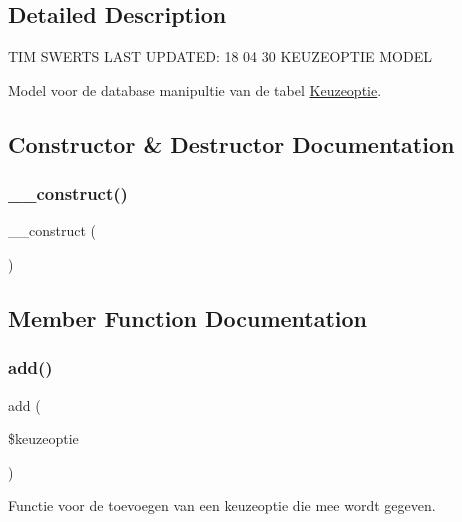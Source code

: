 \subsection{Detailed Description}
T\+IM S\+W\+E\+R\+TS L\+A\+ST U\+P\+D\+A\+T\+ED\+: 18 04 30 K\+E\+U\+Z\+E\+O\+P\+T\+IE M\+O\+D\+EL

Model voor de database manipultie van de tabel \mbox{\hyperlink{class_keuzeoptie}{Keuzeoptie}}. 

\subsection{Constructor \& Destructor Documentation}
\mbox{\label{class_keuzeoptie___model_a095c5d389db211932136b53f25f39685}} 
\subsubsection{\texorpdfstring{\+\_\+\+\_\+construct()}{\_\_construct()}}
{\footnotesize\ttfamily \+\_\+\+\_\+construct (\begin{DoxyParamCaption}{ }\end{DoxyParamCaption})}



\subsection{Member Function Documentation}
\mbox{\label{class_keuzeoptie___model_a2452f524e794bc3f418d60cb296e19b5}} 
\subsubsection{\texorpdfstring{add()}{add()}}
{\footnotesize\ttfamily add (\begin{DoxyParamCaption}\item[{}]{\$keuzeoptie }\end{DoxyParamCaption})}



Functie voor de toevoegen van een keuzeoptie die mee wordt gegeven. 


